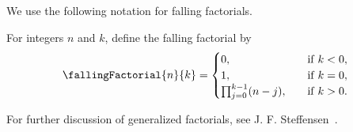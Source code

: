 We use the following notation for falling factorials.
\begin{definition}
  \label{def:falling-factorials}
  For integers $n$ and $k$, define the falling factorial by
  \begin{align*}
    \fallingFactorial{n}{k} =
    \begin{cases}
      0, \quad & \mathrm{if \; } k < 0, \\
      1, \quad & \mathrm{if \; } k = 0, \\
      \prod_{j=0}^{k-1} (n-j), \quad & \mathrm{if \; } k>0.
    \end{cases}
  \end{align*}
\end{definition}
For further discussion of generalized factorials, see J. F. Steffensen~\cite{steffensen1933definition}.
